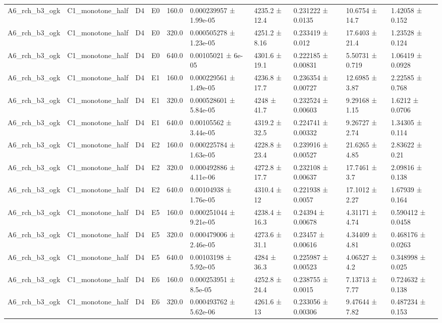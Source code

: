 \begin{table}
\begin{tabular}{llllllllll}
A6\_rch\_b3\_ogk & C1\_monotone\_half & D4 & E0 & 160.0 & 0.000239957 ± 1.99e-05 & 4235.2 ± 12.4 & 0.231222 ± 0.0135 & 10.6754 ± 14.7 & 1.42058 ± 0.152 \\
A6\_rch\_b3\_ogk & C1\_monotone\_half & D4 & E0 & 320.0 & 0.000505278 ± 1.23e-05 & 4251.2 ± 8.16 & 0.233419 ± 0.012 & 17.6403 ± 21.4 & 1.23528 ± 0.124 \\
A6\_rch\_b3\_ogk & C1\_monotone\_half & D4 & E0 & 640.0 & 0.00105021 ± 6e-05 & 4301.6 ± 19.1 & 0.222185 ± 0.00831 & 5.50731 ± 0.719 & 1.06419 ± 0.0928 \\
A6\_rch\_b3\_ogk & C1\_monotone\_half & D4 & E1 & 160.0 & 0.000229561 ± 1.49e-05 & 4236.8 ± 17.7 & 0.236354 ± 0.00727 & 12.6985 ± 3.87 & 2.22585 ± 0.768 \\
A6\_rch\_b3\_ogk & C1\_monotone\_half & D4 & E1 & 320.0 & 0.000528601 ± 5.84e-05 & 4248 ± 41.7 & 0.232524 ± 0.00603 & 9.29168 ± 1.15 & 1.6212 ± 0.0706 \\
A6\_rch\_b3\_ogk & C1\_monotone\_half & D4 & E1 & 640.0 & 0.00105562 ± 3.44e-05 & 4319.2 ± 32.5 & 0.224741 ± 0.00332 & 9.26727 ± 2.74 & 1.34305 ± 0.114 \\
A6\_rch\_b3\_ogk & C1\_monotone\_half & D4 & E2 & 160.0 & 0.000225784 ± 1.63e-05 & 4228.8 ± 23.4 & 0.239916 ± 0.00527 & 21.6265 ± 4.85 & 2.83622 ± 0.21 \\
A6\_rch\_b3\_ogk & C1\_monotone\_half & D4 & E2 & 320.0 & 0.000492886 ± 4.11e-06 & 4272.8 ± 17.7 & 0.232108 ± 0.00637 & 17.7461 ± 3.7 & 2.09816 ± 0.138 \\
A6\_rch\_b3\_ogk & C1\_monotone\_half & D4 & E2 & 640.0 & 0.00104938 ± 1.76e-05 & 4310.4 ± 12 & 0.221938 ± 0.0057 & 17.1012 ± 2.27 & 1.67939 ± 0.164 \\
A6\_rch\_b3\_ogk & C1\_monotone\_half & D4 & E5 & 160.0 & 0.000251044 ± 9.21e-05 & 4238.4 ± 16.3 & 0.24394 ± 0.00678 & 4.31171 ± 4.74 & 0.590412 ± 0.0458 \\
A6\_rch\_b3\_ogk & C1\_monotone\_half & D4 & E5 & 320.0 & 0.000479006 ± 2.46e-05 & 4273.6 ± 31.1 & 0.23457 ± 0.00616 & 4.34409 ± 4.81 & 0.468176 ± 0.0263 \\
A6\_rch\_b3\_ogk & C1\_monotone\_half & D4 & E5 & 640.0 & 0.00103198 ± 5.92e-05 & 4284 ± 36.3 & 0.225987 ± 0.00523 & 4.06527 ± 4.2 & 0.348998 ± 0.025 \\
A6\_rch\_b3\_ogk & C1\_monotone\_half & D4 & E6 & 160.0 & 0.000253951 ± 8.5e-05 & 4252.8 ± 24.4 & 0.238755 ± 0.0015 & 7.13713 ± 7.77 & 0.724632 ± 0.138 \\
A6\_rch\_b3\_ogk & C1\_monotone\_half & D4 & E6 & 320.0 & 0.000493762 ± 5.62e-06 & 4261.6 ± 13 & 0.233056 ± 0.00306 & 9.47644 ± 7.82 & 0.487234 ± 0.153 \\

\end{tabular}
\end{table}
